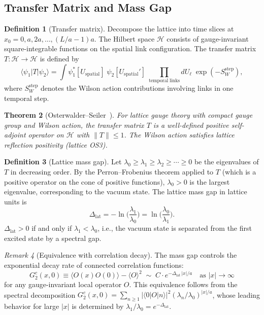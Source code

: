 \documentclass[12pt,a4paper]{article}
\theoremstyle{plain}
\newtheorem{theorem}{Theorem}[section]
\theoremstyle{definition}
\newtheorem{definition}[theorem]{Definition}
\theoremstyle{remark}
\newtheorem{remark}[theorem]{Remark}
\begin{document}
\subsection{Transfer Matrix and Mass Gap}\label{sec:transfer}

\begin{definition}[Transfer matrix]\label{def:transfer}
Decompose the lattice into time slices at $x_0=0,a,2a,\ldots,(L/a-1)a$. The Hilbert space $\mathcal{H}$ consists of gauge-invariant square-integrable functions on the spatial link configuration. The transfer matrix $T:\mathcal{H}\to\mathcal{H}$ is defined by
\begin{equation}
\langle\psi_1|T|\psi_2\rangle = \int \psi_1^*[U_{\mathrm{spatial}}]\;\psi_2[U_{\mathrm{spatial}}']\;\prod_{\mathrm{temporal\;links}}dU_\ell\;\exp(-S_W^{\mathrm{step}}),
\end{equation}
where $S_W^{\mathrm{step}}$ denotes the Wilson action contributions involving links in one temporal step.
\end{definition}

\begin{theorem}[Osterwalder--Seiler~\cite{OsterwalderSeiler1978}]\label{thm:OS}
For lattice gauge theory with compact gauge group and Wilson action, the transfer matrix $T$ is a well-defined positive self-adjoint operator on $\mathcal{H}$ with $\|T\|\leq 1$. The Wilson action satisfies lattice reflection positivity (lattice OS3).
\end{theorem}

\begin{definition}[Lattice mass gap]\label{def:gap}
Let $\lambda_0\geq\lambda_1\geq\lambda_2\geq\cdots\geq 0$ be the eigenvalues of $T$ in decreasing order. By the Perron--Frobenius theorem applied to $T$ (which is a positive operator on the cone of positive functions), $\lambda_0>0$ is the largest eigenvalue, corresponding to the vacuum state. The lattice mass gap in lattice units is
\begin{equation}\label{eq:gapdef}
\Delta_{\mathrm{lat}} = -\ln\!\Big(\frac{\lambda_1}{\lambda_0}\Big) = \ln\!\Big(\frac{\lambda_0}{\lambda_1}\Big).
\end{equation}
$\Delta_{\mathrm{lat}}>0$ if and only if $\lambda_1<\lambda_0$, i.e., the vacuum state is separated from the first excited state by a spectral gap.
\end{definition}

\begin{remark}[Equivalence with correlation decay]
The mass gap controls the exponential decay rate of connected correlation functions:
\begin{equation}\label{eq:expdecay}
G_2^c(x,0) \equiv \langle O(x)O(0)\rangle - \langle O\rangle^2 \;\sim\; C\cdot e^{-\Delta_{\mathrm{lat}}\,|x|/a} \quad\text{as }|x|\to\infty
\end{equation}
for any gauge-invariant local operator $O$. This equivalence follows from the spectral decomposition $G_2^c(x,0)=\sum_{n\geq 1}|\langle 0|O|n\rangle|^2(\lambda_n/\lambda_0)^{|x|/a}$, whose leading behavior for large $|x|$ is determined by $\lambda_1/\lambda_0=e^{-\Delta_{\mathrm{lat}}}$.
\end{remark}
\end{document}
